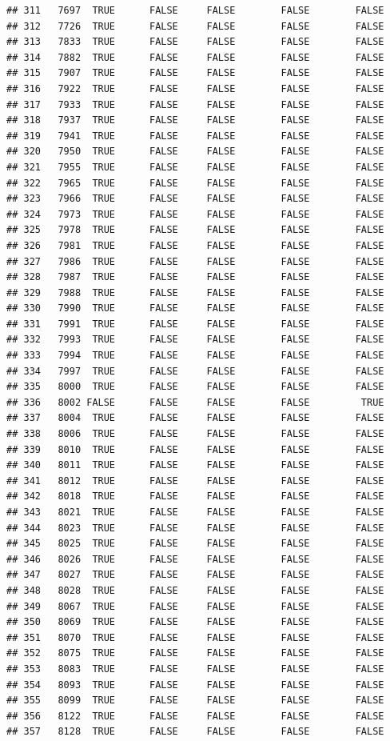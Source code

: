 \documentclass[
  10pt,
  b5paper,
  oneside]{book}
\begin{document}
\begin{verbatim}
## 311   7697  TRUE      FALSE     FALSE        FALSE        FALSE
## 312   7726  TRUE      FALSE     FALSE        FALSE        FALSE
## 313   7833  TRUE      FALSE     FALSE        FALSE        FALSE
## 314   7882  TRUE      FALSE     FALSE        FALSE        FALSE
## 315   7907  TRUE      FALSE     FALSE        FALSE        FALSE
## 316   7922  TRUE      FALSE     FALSE        FALSE        FALSE
## 317   7933  TRUE      FALSE     FALSE        FALSE        FALSE
## 318   7937  TRUE      FALSE     FALSE        FALSE        FALSE
## 319   7941  TRUE      FALSE     FALSE        FALSE        FALSE
## 320   7950  TRUE      FALSE     FALSE        FALSE        FALSE
## 321   7955  TRUE      FALSE     FALSE        FALSE        FALSE
## 322   7965  TRUE      FALSE     FALSE        FALSE        FALSE
## 323   7966  TRUE      FALSE     FALSE        FALSE        FALSE
## 324   7973  TRUE      FALSE     FALSE        FALSE        FALSE
## 325   7978  TRUE      FALSE     FALSE        FALSE        FALSE
## 326   7981  TRUE      FALSE     FALSE        FALSE        FALSE
## 327   7986  TRUE      FALSE     FALSE        FALSE        FALSE
## 328   7987  TRUE      FALSE     FALSE        FALSE        FALSE
## 329   7988  TRUE      FALSE     FALSE        FALSE        FALSE
## 330   7990  TRUE      FALSE     FALSE        FALSE        FALSE
## 331   7991  TRUE      FALSE     FALSE        FALSE        FALSE
## 332   7993  TRUE      FALSE     FALSE        FALSE        FALSE
## 333   7994  TRUE      FALSE     FALSE        FALSE        FALSE
## 334   7997  TRUE      FALSE     FALSE        FALSE        FALSE
## 335   8000  TRUE      FALSE     FALSE        FALSE        FALSE
## 336   8002 FALSE      FALSE     FALSE        FALSE         TRUE
## 337   8004  TRUE      FALSE     FALSE        FALSE        FALSE
## 338   8006  TRUE      FALSE     FALSE        FALSE        FALSE
## 339   8010  TRUE      FALSE     FALSE        FALSE        FALSE
## 340   8011  TRUE      FALSE     FALSE        FALSE        FALSE
## 341   8012  TRUE      FALSE     FALSE        FALSE        FALSE
## 342   8018  TRUE      FALSE     FALSE        FALSE        FALSE
## 343   8021  TRUE      FALSE     FALSE        FALSE        FALSE
## 344   8023  TRUE      FALSE     FALSE        FALSE        FALSE
## 345   8025  TRUE      FALSE     FALSE        FALSE        FALSE
## 346   8026  TRUE      FALSE     FALSE        FALSE        FALSE
## 347   8027  TRUE      FALSE     FALSE        FALSE        FALSE
## 348   8028  TRUE      FALSE     FALSE        FALSE        FALSE
## 349   8067  TRUE      FALSE     FALSE        FALSE        FALSE
## 350   8069  TRUE      FALSE     FALSE        FALSE        FALSE
## 351   8070  TRUE      FALSE     FALSE        FALSE        FALSE
## 352   8075  TRUE      FALSE     FALSE        FALSE        FALSE
## 353   8083  TRUE      FALSE     FALSE        FALSE        FALSE
## 354   8093  TRUE      FALSE     FALSE        FALSE        FALSE
## 355   8099  TRUE      FALSE     FALSE        FALSE        FALSE
## 356   8122  TRUE      FALSE     FALSE        FALSE        FALSE
## 357   8128  TRUE      FALSE     FALSE        FALSE        FALSE
\end{verbatim}
\end{document}
